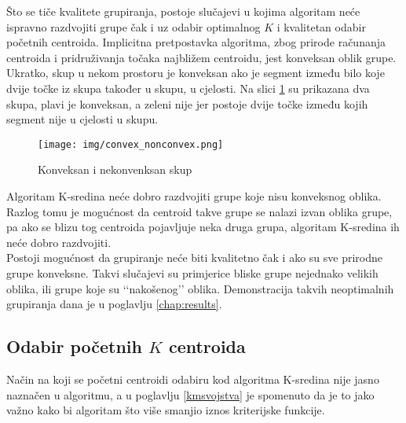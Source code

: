 \documentclass[times, utf8, zavrsni]{fer}
\begin{document}
Što se tiče kvalitete grupiranja, postoje slučajevi u kojima algoritam neće ispravno razdvojiti grupe čak i uz odabir optimalnog $K$ i kvalitetan odabir početnih centroida. Implicitna pretpostavka algoritma, zbog prirode računanja centroida i pridruživanja točaka najbližem centroidu, jest konveksan oblik grupe. Ukratko, skup u nekom prostoru je konveksan ako je segment između bilo koje dvije točke iz skupa također u skupu, u cjelosti. Na slici \ref{fig:convexset} su prikazana dva skupa, plavi je konveksan, a zeleni nije jer postoje dvije točke između kojih segment nije u cjelosti u skupu.
\begin{figure}[H]
    \centering
    \texttt{[image: img/convex\_nonconvex.png]}
    \caption{Konveksan i nekonvenksan skup}
    \label{fig:convexset}
\end{figure}
Algoritam K-sredina neće dobro razdvojiti grupe koje nisu konveksnog oblika. Razlog tomu je mogućnost da centroid takve grupe se nalazi izvan oblika grupe, pa ako se blizu tog centroida pojavljuje neka druga grupa, algoritam K-sredina ih neće dobro razdvojiti.\\
Postoji mogućnost da grupiranje neće biti kvalitetno čak i ako su sve prirodne grupe konveksne. Takvi slučajevi su primjerice bliske grupe nejednako velikih oblika, ili grupe koje su ‘‘nakošenog’’ oblika. Demonstracija takvih neoptimalnih grupiranja dana je u poglavlju \ref{chap:results}.

\subsection{Odabir početnih $K$ centroida}
\label{kminitial}
Način na koji se početni centroidi odabiru kod algoritma K-sredina nije jasno naznačen u algoritmu, a u poglavlju \ref{kmsvojstva} je spomenuto da je to jako važno kako bi algoritam što više smanjio iznos kriterijske funkcije.
\end{document}
